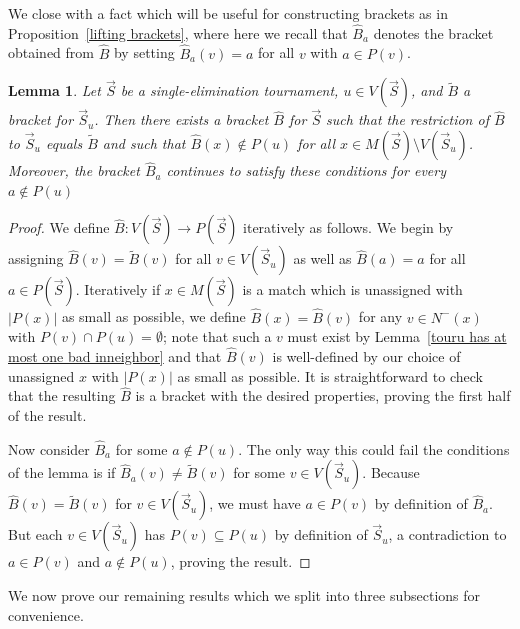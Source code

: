 \documentclass[12pt,letterpaper]{article}
\newtheorem{lem}[thm]{Lemma}
\theoremstyle{definition}
\renewcommand{\1}{\mathbbm{1}}
\newcommand{\sm}{\setminus}
\newcommand{\sub}{\subseteq}
\newcommand{\tour}{\vec{S}}
\begin{document}
We close with a fact which will be useful for constructing brackets as in Proposition~\ref{lifting brackets}, where here we recall that $\widehat{B}_a$ denotes the bracket obtained from $\widehat{B}$ by setting $\widehat{B}_a(v)=a$ for all $v$ with $a\in P(v)$.
\begin{lem}\label{constructing lifting brackets}
	Let $\tour$ be a single-elimination tournament, $u\in V(\tour)$, and $\widetilde{B}$ a bracket for $\tour_u$.  Then there exists a bracket $\widehat{B}$ for $\tour$ such that the restriction of $\widehat{B}$ to $\tour_u$ equals $\widetilde{B}$ and such that $\widehat{B}(x)\notin P(u)$ for all $x\in M(\tour)\sm V(\tour_u)$.  Moreover, the bracket $\widehat{B}_a$ continues to satisfy these conditions for every $a\notin P(u)$
\end{lem}
\begin{proof}
	We define $\widehat{B}:V(\tour)\to P(\tour)$ iteratively as follows.  We begin by assigning $\widehat{B}(v)=\widetilde{B}(v)$ for all $v\in V(\tour_u)$ as well as $\widehat{B}(a)=a$ for all $a\in P(\tour)$.  Iteratively if $x\in M(\tour)$ is a match which is unassigned with $|P(x)|$ as small as possible,  we define $\widehat{B}(x)=\widehat{B}(v)$ for any $v\in N^-(x)$ with $P(v)\cap P(u)=\emptyset$; note that such a $v$ must exist by Lemma~\ref{touru has at most one bad inneighbor} and that $\widehat{B}(v)$ is well-defined by our choice of unassigned $x$ with $|P(x)|$ as small as possible.  It is straightforward to check that the resulting $\widehat{B}$ is a bracket with the desired properties, proving the first half of the result.
	
	Now consider $\widehat{B}_a$ for some $a\notin P(u)$.  The only way this could fail the conditions of the lemma is if $\widehat{B}_a(v)\ne \widetilde{B}(v)$ for some $v\in V(\tour_u)$.  Because $\widehat{B}(v)=\widetilde{B}(v)$ for $v\in V(\tour_u)$, we must have $a\in P(v)$ by definition of $\widehat{B}_a$.  But each $v\in V(\tour_u)$ has $P(v)\sub P(u)$ by definition of $\tour_u$, a contradiction to $a\in P(v)$ and $a\notin P(u)$, proving the result.
\end{proof}

We now prove our remaining results which we split into three subsections for convenience.
\end{document}
